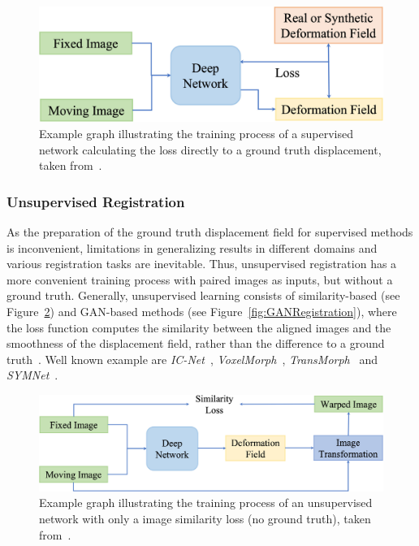 \begin{figure}[h] %
	\centering
	\graphicspath{{images/}{\main/images/}}
	\includegraphics[width=\linewidth]{SupervisedRegistrationGraph.jpg} 
	\caption{Example graph illustrating the training process of a supervised network calculating the loss directly to a ground truth displacement, taken from~\cite{Zou2022}.}
	\label{fig:SupervisedRegistration}
\end{figure}


\subsubsection{Unsupervised Registration} \label{SubSubSec:UnsupervisedRegistration}
As the preparation of the ground truth displacement field for supervised methods is inconvenient, limitations in generalizing results in different domains and various registration tasks are inevitable. Thus, unsupervised registration has a more convenient training process with paired images as inputs, but without a ground truth. Generally, unsupervised learning consists of similarity-based (see Figure~\ref{fig:UnsupervisedRegistration}) and GAN-based methods (see Figure~\ref{fig:GANRegistration}), where the loss function computes the similarity between the aligned images and the smoothness of the displacement field, rather than the difference to a ground truth~\cite{Zou2022}. Well known example are \emph{IC-Net}~\cite{IC-Net},  \emph{VoxelMorph}~\cite{Voxelmorph}, \emph{TransMorph}~\cite{TransMorph} and \emph{SYMNet}~\cite{SYM-Net}.

\begin{figure}[h] %
	\centering
	\graphicspath{{images/}{\main/images/}}
	\includegraphics[width=\linewidth]{UnsupervisedRegistrationGraph.jpg} 
	\caption{Example graph illustrating the training process of an unsupervised network with only a image similarity loss (no ground truth), taken from~\cite{Zou2022}.}
	\label{fig:UnsupervisedRegistration}
\end{figure}

